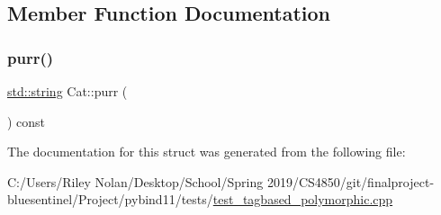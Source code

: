 \subsection{Member Function Documentation}
\mbox{\label{struct_cat_ae9dbc30672ea0d779fd109c73dc5a343}} 
\subsubsection{\texorpdfstring{purr()}{purr()}}
{\footnotesize\ttfamily \mbox{\hyperlink{_s_d_l__opengl__glext_8h_ab4ccfaa8ab0e1afaae94dc96ef52dde1}{std\+::string}} Cat\+::purr (\begin{DoxyParamCaption}{ }\end{DoxyParamCaption}) const\hspace{0.3cm}{\ttfamily [inline]}}



The documentation for this struct was generated from the following file\+:\begin{DoxyCompactItemize}
\item 
C\+:/\+Users/\+Riley Nolan/\+Desktop/\+School/\+Spring 2019/\+C\+S4850/git/finalproject-\/bluesentinel/\+Project/pybind11/tests/\mbox{\hyperlink{test__tagbased__polymorphic_8cpp}{test\+\_\+tagbased\+\_\+polymorphic.\+cpp}}\end{DoxyCompactItemize}
